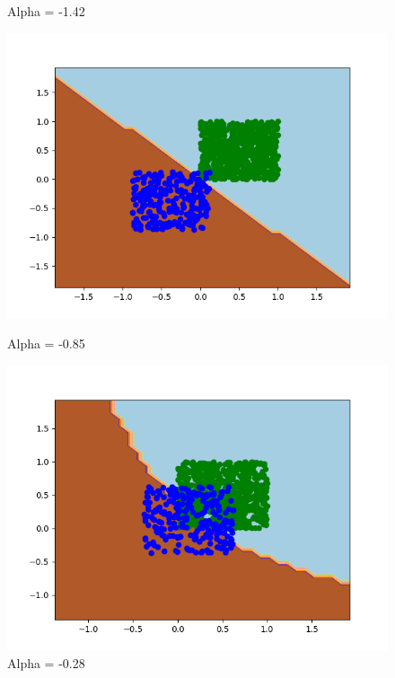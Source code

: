 \documentclass{article}
\begin{document}
\begin{figure}[!htb]
\begin{minipage}{0.24\textwidth}
			\caption{Alpha = -1.42}
	\end{minipage}
	\begin{minipage}{0.24\textwidth}
		\centering
		\includegraphics[width=1\linewidth]{../unequalpriors/this9.png}
		\caption{Alpha = -0.85}
	\end{minipage}
	\begin{minipage}{0.24\textwidth}
		\centering
		\includegraphics[width=1\linewidth]{../unequalpriors/this13.png}
		\caption{Alpha = -0.28}
	\end{minipage}
	\begin{minipage}{0.24\textwidth}
		\centering

\end{minipage}
\end{figure}
\end{document}
